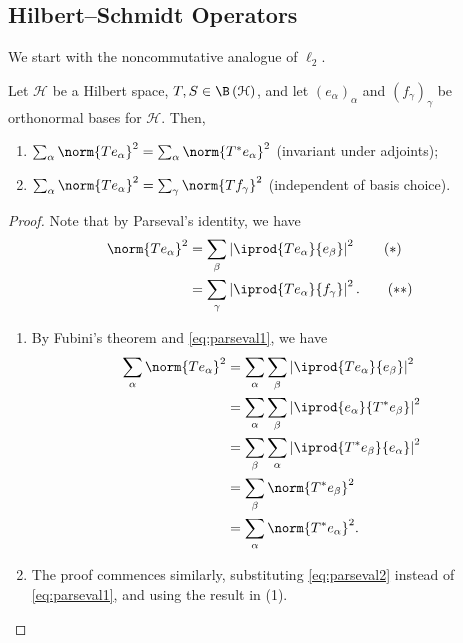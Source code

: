\documentclass[10pt]{mypackage}
\begin{document}
\subsection{Hilbert--Schmidt Operators}%
We start with the noncommutative analogue of $\ell_2$.
\begin{lemma}
  Let $\mathcal{H}$ be a Hilbert space, $T,S\in \B\left( \mathcal{H} \right)$, and let $\left( e_{\alpha} \right)_{\alpha}$ and $\left( f_{\gamma} \right)_{\gamma}$ be orthonormal bases for $\mathcal{H}$. Then,
  \begin{enumerate}[(1)]
    \item $\sum_{\alpha}\norm{Te_{\alpha}}^2 = \sum_{\alpha}\norm{T^{\ast}e_{\alpha}}^2$ (invariant under adjoints);
    \item $\sum_{\alpha}\norm{Te_{\alpha}}^2 = \sum_{\gamma}\norm{Tf_{\gamma}}^2$ (independent of basis choice).
  \end{enumerate}
\end{lemma}
\begin{proof}
  Note that by Parseval's identity, we have
  \begin{align*}
    \norm{Te_{\alpha}}^2 &= \sum_{\beta}\left\vert \iprod{Te_{\alpha}}{e_{\beta}} \right\vert^2\label{eq:parseval1}\tag{\textasteriskcentered}\\
                         &= \sum_{\gamma}\left\vert \iprod{Te_{\alpha}}{f_{\gamma}} \right\vert^2.\label{eq:parseval2}\tag{\textasteriskcentered\textasteriskcentered}
  \end{align*}
  \begin{enumerate}[(1)]
    \item By Fubini's theorem and \eqref{eq:parseval1}, we have
      \begin{align*}
        \sum_{\alpha}\norm{Te_{\alpha}}^2 &= \sum_{\alpha}\sum_{\beta}\left\vert \iprod{Te_{\alpha}}{e_{\beta}} \right\vert^2\\
                                          &= \sum_{\alpha}\sum_{\beta}\left\vert \iprod{e_{\alpha}}{T^{\ast}e_{\beta}} \right\vert^2\\
                                          &= \sum_{\beta}\sum_{\alpha}\left\vert \iprod{T^{\ast}e_{\beta}}{e_{\alpha}} \right\vert^2\\
                                          &= \sum_{\beta}\norm{T^{\ast}e_{\beta}}^2\\
                                          &= \sum_{\alpha}\norm{T^{\ast}e_{\alpha}}^2.
      \end{align*}
    \item The proof commences similarly, substituting \eqref{eq:parseval2} instead of \eqref{eq:parseval1}, and using the result in (1).
  \end{enumerate}
\end{proof}
\end{document}
